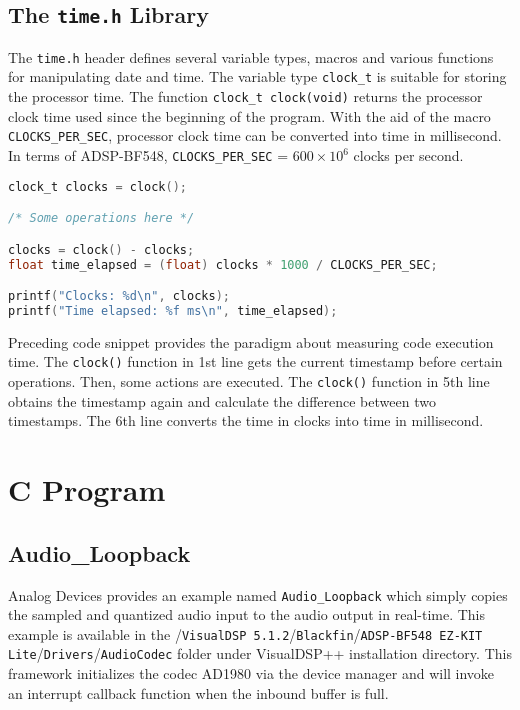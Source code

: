 \subsection{The \texttt{time.h} Library}

The \texttt{time.h} header defines several variable types, macros and various functions for manipulating date and time. The variable type \texttt{clock\_t} is suitable for storing the processor time. The function \texttt{clock\_t clock(void)} returns the processor clock time used since the beginning of the program. With the aid of the macro \texttt{CLOCKS\_PER\_SEC}, processor clock time can be converted into time in millisecond. In terms of ADSP-BF548, \texttt{CLOCKS\_PER\_SEC} = $600 \times 10^6$ clocks per second.

\begin{lstlisting}[language={C}, stepnumber=1]
clock_t clocks = clock();

/* Some operations here */

clocks = clock() - clocks;
float time_elapsed = (float) clocks * 1000 / CLOCKS_PER_SEC;

printf("Clocks: %d\n", clocks);
printf("Time elapsed: %f ms\n", time_elapsed);
\end{lstlisting}

Preceding code snippet provides the paradigm about measuring code execution time. The \texttt{clock()} function in 1st line gets the current timestamp before certain operations. Then, some actions are executed. The \texttt{clock()} function in 5th line obtains the timestamp again and calculate the difference between two timestamps. The 6th line converts the time in clocks into time in millisecond.


\section{C Program}
\label{section:c_program}


\subsection{Audio\_Loopback}

Analog Devices provides an example named \texttt{Audio\_Loopback} which simply copies the sampled and quantized audio input to the audio output in real-time. This example is available in the /\texttt{VisualDSP 5.1.2}/\texttt{Blackfin}/\texttt{ADSP-BF548 EZ-KIT Lite}/\texttt{Drivers}/\texttt{AudioCodec} folder under VisualDSP++ installation directory. This framework initializes the codec AD1980 via the device manager and will invoke an interrupt callback function when the inbound buffer is full.\\

